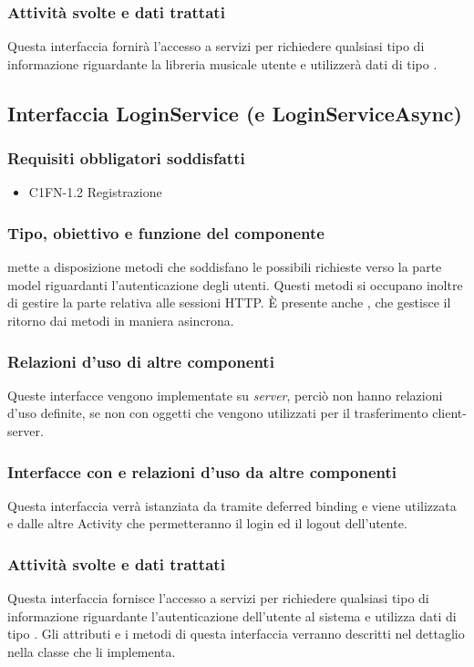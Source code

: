 \subsubsection*{Attivit\`a svolte e dati trattati}
Questa interfaccia fornir\`a l'accesso a servizi per richiedere qualsiasi tipo
di informazione riguardante la libreria musicale utente e utilizzer\`a dati di
tipo .


\subsection{Interfaccia LoginService (e LoginServiceAsync)}
\subsubsection*{Requisiti obbligatori soddisfatti}
\begin{itemize}
	\item C1FN-1.2 Registrazione
\end{itemize}
\subsubsection*{Tipo, obiettivo e funzione del componente}
 mette a disposizione metodi
che soddisfano le possibili richieste verso la parte model riguardanti l'autenticazione degli utenti.
Questi metodi si occupano inoltre di gestire la parte relativa alle sessioni HTTP. 
\`E presente anche , che gestisce il ritorno dai
metodi in maniera asincrona.

\subsubsection*{Relazioni d'uso di altre componenti}
Queste interfacce vengono implementate su \emph{server}, perci\`o non
hanno relazioni d'uso definite, se non con oggetti  che
vengono utilizzati per il trasferimento client-server.

\subsubsection*{Interfacce con e relazioni d'uso da altre componenti}
Questa interfaccia verr\`a istanziata da  tramite deferred
binding e viene utilizzata \\ e dalle altre Activity che
permetteranno il login ed il logout dell'utente.

\subsubsection*{Attivit\`a svolte e dati trattati}
Questa interfaccia fornisce l'accesso a servizi per richiedere qualsiasi tipo
di informazione riguardante l'autenticazione dell'utente al sistema
e utilizza dati di tipo .
Gli attributi e i metodi di questa interfaccia verranno descritti nel
dettaglio nella classe  che li implementa. 

